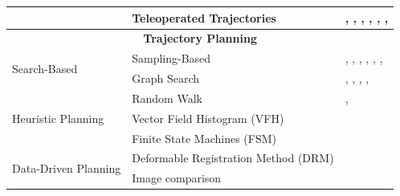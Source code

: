 \begin{table}[!h]
\begin{tabular}{|p{4cm}|p{5cm}|p{15cm}|}
    & Teleoperated Trajectories             & \cite{Huang2013BehaviorB}, \cite{Stulp2009LearningAP}, \cite{Pohl2024MAkEableMA}, \cite{Deng2017ReinforcementLO}, \cite{Li2017ReinforcementLO}, \cite{Short2019SAILSA}, \cite{Klamt2018SupervisedAL} \\
\hline
\multicolumn{3}{|c|}{\textbf{Trajectory Planning}} \\
\hline
\multirow{2}{*}{\parbox{2cm}{Search-Based}}
    & Sampling-Based                       & \cite{Lee2018PlanningAC}, \cite{Peng2024RevolutionizingBD}, \cite{Karumanchi2017TeamRS}, \cite{Zsoldos2025TowardsRL}, \cite{Kotecha2024AHM}, \cite{Wahba2025pcdbCBSKM}, \cite{Wu2024InTW} \\
\cline{2-3}
    & Graph Search                         & \cite{Cohen2011PlanningFM}, \cite{Partovi2017ReactiveIM}, \cite{Cohen2012SearchbasedPF}, \cite{Cohen2010SearchbasedPF}, \cite{Williams2012ARA} \\
\hline
\multirow{3}{*}{\parbox{3cm}{Heuristic Planning}}
    & Random Walk                          & \cite{Chang2006ABB}, \cite{Chang2006AnalysisOA} \\
\cline{2-3}
    & Vector Field Histogram (VFH)         & \cite{Tsay2010MaterialHO} \\
\cline{2-3}
    & Finite State Machines (FSM)         & \cite{Lim2008MultipleHC} \\
\hline
\multirow{2}{*}{\parbox{3cm}{Data-Driven Planning}}
    & Deformable Registration Method (DRM) & \cite{Stckler2014EfficientDR} \\
\cline{2-3}
    & Image comparison                     & \cite{Kenney2009InteractiveSF} \\
\hline
\end{tabular}
\end{table}

